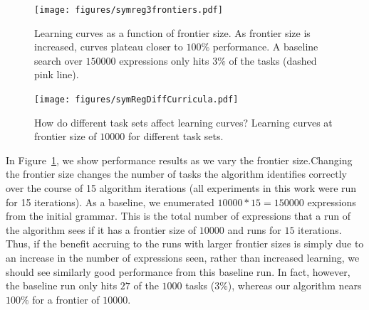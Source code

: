 \documentclass{article}
\begin{document}
\setcounter{subfigure}{0} 
\begin{figure}[ht]
\centering
\texttt{[image: figures/symreg3frontiers.pdf]}
\vspace{-.2cm}
\caption{Learning curves as a function of frontier size.  As frontier
  size is increased, curves plateau closer to $100\%$ performance. A
  baseline search over $150000$ expressions only hits $3\%$ of the
  tasks (dashed pink line). \label{fig:symregLearning}}
\vspace{-.3cm}
\end{figure}
\begin{figure}[ht]
\texttt{[image: figures/symRegDiffCurricula.pdf]}
\caption{How do different task sets affect learning curves? Learning
  curves at frontier size of $10000$ for different task
  sets.} 
\label{fig:symregCurricula}

\end{figure}







In Figure~\ref{fig:symregLearning}, we show performance results as we
vary the frontier size.Changing the frontier size changes the number
of tasks the algorithm identifies correctly over the course of 15
algorithm iterations (all experiments in this work were run for 15
iterations). As a baseline, we enumerated $10000*15=150000$
expressions from the initial grammar. This is the total number of
expressions that a run of the algorithm sees if it has a frontier size
of $10000$ and runs for $15$ iterations. Thus, if the benefit accruing
to the runs with larger frontier sizes is simply due to an increase in
the number of expressions seen, rather than increased learning, we
should see similarly good performance from this baseline run. In fact,
however, the baseline run only hits $27$ of the $1000$ tasks ($3\%$),
whereas our algorithm nears $100\%$ for a frontier of $10000$.
\end{document}
